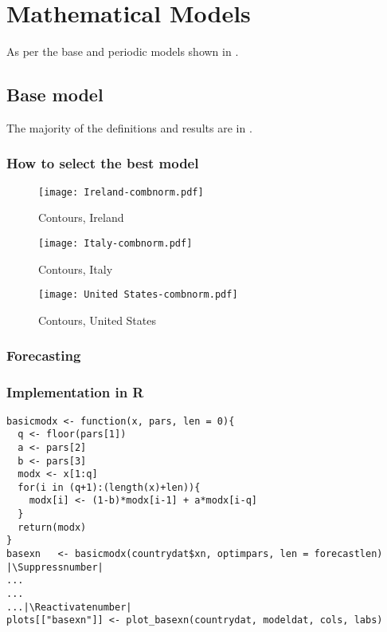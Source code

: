 \section{Mathematical Models}
\label{ch:mathmodel}

As per the base and periodic models shown in \cite{grigor20}.

\subsection{Base model}

The majority of the definitions and results are in \label{ch:theorems}.

\subsubsection{How to select the best model}

\begin{figure}[H]
  \texttt{[image: Ireland-combnorm.pdf]} \label{fig:ireland-combnorm}
\caption{Contours, Ireland}
\endminipage\hfill
{}
  \texttt{[image: Italy-combnorm.pdf]} \label{fig:italy-combnorm}
\caption{Contours, Italy}
\endminipage\hfill
{}
  \texttt{[image: United States-combnorm.pdf]} \label{fig:usa-combnorm}
\caption{Contours, United States}
\endminipage\hfill
\end{figure}

\subsubsection{Forecasting}

\subsubsection{Implementation in R}

\begin{lstlisting}[breaklines = true, escapeinside=||, tabsize = 4, caption = {Algorithm for Base Model}]
basicmodx <- function(x, pars, len = 0){
  q <- floor(pars[1])
  a <- pars[2]
  b <- pars[3]
  modx <- x[1:q]
  for(i in (q+1):(length(x)+len)){
    modx[i] <- (1-b)*modx[i-1] + a*modx[i-q]
  }
  return(modx)
}
basexn   <- basicmodx(countrydat$xn, optimpars, len = forecastlen)  |\Suppressnumber|
...
...
...|\Reactivatenumber|
plots[["basexn"]] <- plot_basexn(countrydat, modeldat, cols, labs)
\end{lstlisting}

